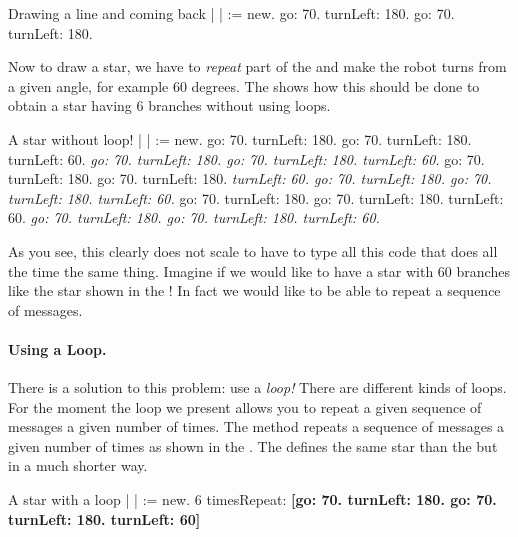 \begin{scriptwithtitle}{Drawing a line and coming back}\label{scr:line}
| \caro |
\caro := \Turtle new.
\caro go: 70.
\caro turnLeft: 180.
\caro go: 70.
\caro turnLeft: 180.
\end{scriptwithtitle}

Now to draw a star, we have to \emph{repeat} part of the  and make the robot turns from a given angle, for example 60
degrees. The  shows how this should be done to
obtain a star having 6 branches without using loops.

\begin{scriptwithtitle}{A star without loop!}\label{scr:star}
| \caro |
\caro := \Turtle new.
\caro go: 70.
\caro turnLeft: 180.
\caro go: 70.
\caro turnLeft: 180.
\caro turnLeft: 60. 
\textit{\caro go: 70.
\caro turnLeft: 180.
\caro go: 70.
\caro turnLeft: 180.
\caro turnLeft: 60.}
\caro go: 70.
\caro turnLeft: 180.
\caro go: 70.
\caro turnLeft: 180.
\textit{\caro turnLeft: 60. 
\caro go: 70.
\caro turnLeft: 180.
\caro go: 70.
\caro turnLeft: 180.
\caro turnLeft: 60.} 
\caro go: 70.
\caro turnLeft: 180.
\caro go: 70.
\caro turnLeft: 180.
\caro turnLeft: 60. 
\textit{\caro go: 70.
\caro turnLeft: 180.
\caro go: 70.
\caro turnLeft: 180.
\caro turnLeft: 60.} 
\end{scriptwithtitle}

As you see, this clearly does not scale to have to type all this code that
does all the time the same thing. Imagine if we would like to have a
star with 60 branches like the star shown in the
! In fact we would like to be able to 
repeat a sequence of messages.

\paragraph{Using a  Loop.} There is a solution to this problem: use a \emph{loop!} There are different kinds of loops. For the moment the loop we present allows you to repeat a given sequence of messages a given number of times. The method \timesRepeat  {} repeats a sequence of  messages a given number of times as shown in the . The  defines the same star than the  but in a much shorter way. 

\begin{scriptwithtitle}{A star with a loop}\label{scr:starloop}
| \caro |
\caro := \Turtle new.
6 timesRepeat: 
     \textbf{\textbf{[}\caro go: 70.
     \caro turnLeft: 180.
     \caro go: 70.
     \caro turnLeft: 180.
     \caro turnLeft: 60\textbf{]}}
\end{scriptwithtitle} 

